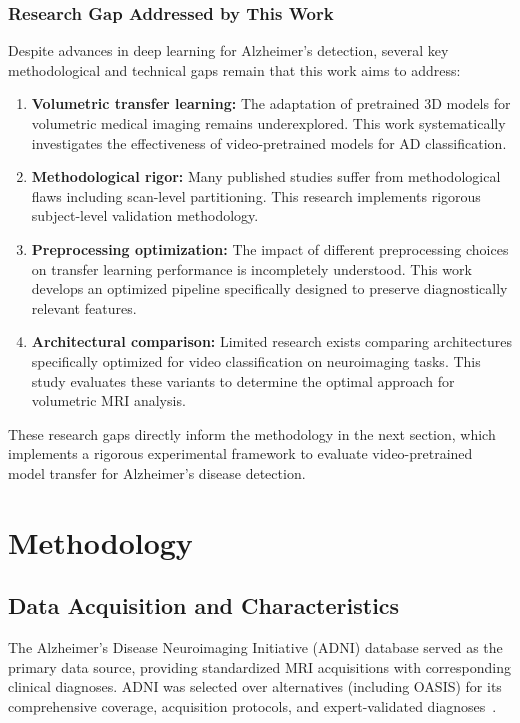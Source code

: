 \documentclass[11pt, a4paper]{article}
\begin{document}
\subsubsection{Research Gap Addressed by This Work}

Despite advances in deep learning for Alzheimer's detection, several key methodological and technical gaps remain that this work aims to address:

\begin{enumerate}
\item \textbf{Volumetric transfer learning:} The adaptation of pretrained 3D models for volumetric medical imaging remains underexplored. This work systematically investigates the effectiveness of video-pretrained models for AD classification.

\item \textbf{Methodological rigor:} Many published studies suffer from methodological flaws including scan-level partitioning. This research implements rigorous subject-level validation methodology.

\item \textbf{Preprocessing optimization:} The impact of different preprocessing choices on transfer learning performance is incompletely understood. This work develops an optimized pipeline specifically designed to preserve diagnostically relevant features.

\item \textbf{Architectural comparison:} Limited research exists comparing architectures specifically optimized for video classification on neuroimaging tasks. This study evaluates these variants to determine the optimal approach for volumetric MRI analysis.
\end{enumerate}

These research gaps directly inform the methodology in the next section, which implements a rigorous experimental framework to evaluate video-pretrained model transfer for Alzheimer's disease detection.

\section{Methodology}
\label{sec:methodology}

\subsection{Data Acquisition and Characteristics}

The Alzheimer's Disease Neuroimaging Initiative (ADNI) database served as the primary data source, providing standardized MRI acquisitions with corresponding clinical diagnoses. ADNI was selected over alternatives (including OASIS) for its comprehensive coverage, acquisition protocols, and expert-validated diagnoses~\cite{jack2008alzheimer, lamontagne2019oasis}.
\end{document}

